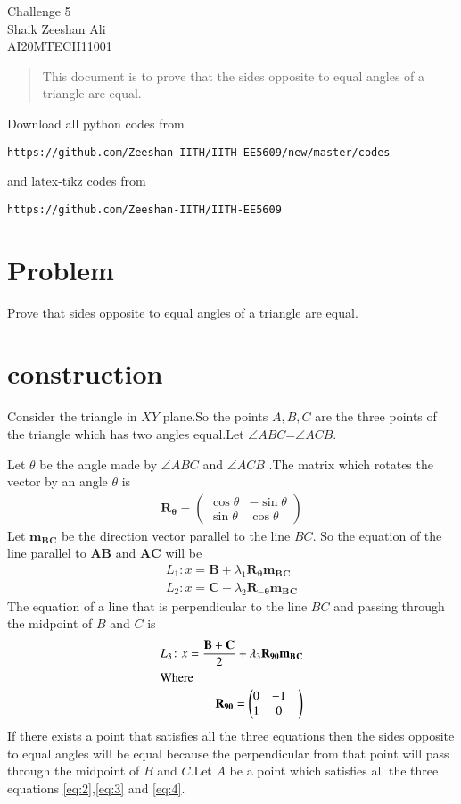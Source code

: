 \documentclass[journal,12pt,twocolumn]{IEEEtran}
\newcommand{\myvec}[1]{\ensuremath{\begin{pmatrix}#1\end{pmatrix}}}
\numberwithin{equation}{subsection}
\let\vec\mathbf
\begin{document}
\begin{center}
\huge Challenge 5\\

\large Shaik Zeeshan Ali\\
\large AI20MTECH11001\\
\end{center}
\begin{abstract}
This document is to prove that the sides opposite to equal angles of a triangle are equal.
\end{abstract}
Download all python codes from 
\begin{lstlisting}
https://github.com/Zeeshan-IITH/IITH-EE5609/new/master/codes
\end{lstlisting}

and latex-tikz codes from 
\begin{lstlisting}
https://github.com/Zeeshan-IITH/IITH-EE5609
\end{lstlisting}
\section{Problem}
Prove that sides opposite to equal angles of a triangle are equal. 
\section{construction}
Consider the triangle in $XY$ plane.So the points $A,B,C$ are the three points of the triangle which has two angles equal.Let $\angle ABC$=$\angle ACB$.\par
Let $\theta$ be the angle made by $\angle ABC$ and $\angle ACB$ .The matrix which rotates the vector by an angle $\theta$ is
\begin{align}
    \vec{R_{\theta}}=\myvec{\cos{\theta} & -\sin{\theta}\\\sin{\theta} &\cos{\theta}}\label{eq:1}
\end{align}
Let $\vec{m_B{_C}}$ be the direction vector parallel to the line $BC$.
So the equation of the line parallel to $\vec{AB}$ and $\vec{AC}$ will be
\begin{align}
    L_1 \colon x=\vec{B}+\lambda_1\vec{R_{\theta}}\vec{m_B{_C}}\label{eq:2}\\
    L_2 \colon x=\vec{C}-\lambda_2\vec{R_{-\theta}}\vec{m_B{_C}}\label{eq:3}
\end{align}
The equation of a line that is perpendicular to the line $BC$ and passing through the midpoint of $B$ and $C$ is
\begin{align}
    L_3 \colon x=\frac{\vec{B+C}}{2}+\lambda_3\vec{R_{90}}\vec{m_B{_C}}\label{eq:4}\\
    \intertext{Where}
    \vec{R_{90}}=\myvec{0&-1\\1&0&}\notag
\end{align}
If there exists a point that satisfies all the three equations then the sides opposite to equal angles will be equal because the perpendicular from that point will pass through the midpoint of $B$ and $C$.Let $A$ be a point which satisfies all the three equations \eqref{eq:2},\eqref{eq:3} and \eqref{eq:4}.
\end{document}
